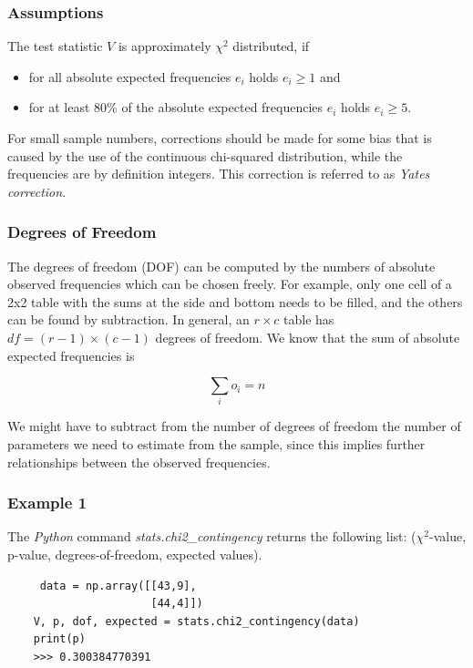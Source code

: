\subsubsection{Assumptions}
The test statistic $V$ is approximately $\chi^2$ distributed, if

\begin{itemize}
  \item for all absolute expected frequencies $e_i$ holds $e_i \geq 1$ and
  \item for at least 80\% of the absolute expected frequencies $e_i$ holds $e_i \geq 5$.
\end{itemize}

For small sample numbers, corrections should be made for some bias that is caused by the use of the continuous chi-squared distribution, while the frequencies are by definition integers. This correction is referred to as \emph{Yates correction}.

\subsubsection{Degrees of Freedom}
The degrees of freedom (DOF) can be computed by the numbers of absolute observed frequencies which can be chosen freely. For example, only one cell of a 2x2 table with the sums at the side and bottom needs to be filled, and the others can be found by subtraction. In general, an $r \times c$ table has $df=(r-1)\times(c-1)$ degrees of freedom.
 We know that the sum of absolute expected frequencies is

\begin{equation}
  \sum_i o_i = n
\end{equation}

We might have to subtract from the number of degrees of freedom the number of parameters we need to estimate from the sample, since this implies further relationships between the observed frequencies.

\subsubsection{Example 1}

The \emph{Python} command \emph{stats.chi2\_contingency} returns the following list: ($\chi^2$-value, p-value, degrees-of-freedom, expected values).

\begin{lstlisting}
     data = np.array([[43,9],
                      [44,4]])
    V, p, dof, expected = stats.chi2_contingency(data)
    print(p)
    >>> 0.300384770391
\end{lstlisting}

